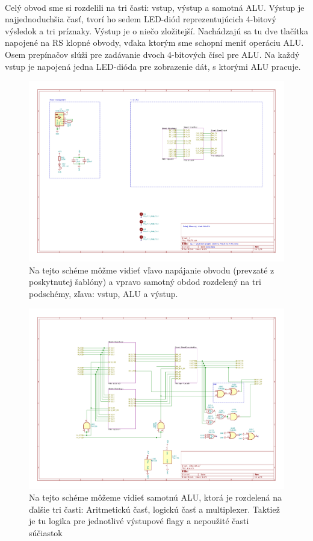 \documentclass{article}
\begin{document}
    \paragraph{}
    Celý obvod sme si rozdelili na tri časti: vstup, výstup a samotná ALU. Výstup je najjednoduchšia časť, tvorí ho sedem LED-diód reprezentujúcich 4-bitový výsledok a tri príznaky. Výstup je o niečo zložitejší. Nachádzajú sa tu dve tlačítka napojené na RS klopné obvody, vďaka ktorým sme schopní meniť operáciu ALU. Osem prepínačov slúži pre zadávanie dvoch 4-bitových čísel pre ALU. Na každý vstup je napojená jedna LED-dióda pre zobrazenie dát, s ktorými ALU pracuje.

    \begin{figure}[h!]
        \centering
        \includegraphics[width=.9\linewidth]{top_sheet.pdf}
        \caption{Na tejto schéme môžme vidieť vľavo napájanie obvodu (prevzaté z poskytnutej šablóny) a vpravo samotný obdod rozdelený na tri podschémy, zľava: vstup, ALU a výstup.}
    \end{figure}

    \begin{figure}[h!]
        \centering
        \includegraphics[width=.9\linewidth]{alu_sheet.pdf}
        \caption{Na tejto schéme môžeme vidieť samotnú ALU, ktorá je rozdelená na ďalšie tri časti: Aritmetickú časť, logickú časť a multiplexer. Taktiež je tu logika pre jednotlivé výstupové flagy a nepoužité časti súčiastok}
    \end{figure}
\end{document}
